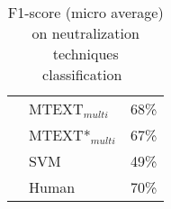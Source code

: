 \begin{table*}[ht]
\begin{subtable}[t]{0.44\textwidth}
{\begin{tabular}{p{2cm}p{1.7cm}P{2cm}}
                \citet{bhatia_automatic_2021-1} & MTEXT$_{multi}$ & 68\% \\
                \citet{bhatia_automatic_2021-1} & MTEXT*$_{multi}$ & 67\% \\
                \citet{bhatia_automatic_2021-1} & SVM & 49\% \\
                \citet{bhatia_automatic_2021-1} & Human & 70\% \\
                \bottomrule
        \end{tabular}
        }
        \caption{F1-score (micro average) on neutralization techniques classification~\cite{bhatia_automatic_2021-1}}
        \label{tab:appendix-bhatia-neutralisation}
    \end{subtable}
    \begin{subtable}[t]{0.54\textwidth}
        \centering
        \vspace{-2.6cm}
        \resizebox{\textwidth}{!}{

}
\end{subtable}
\end{table*}
